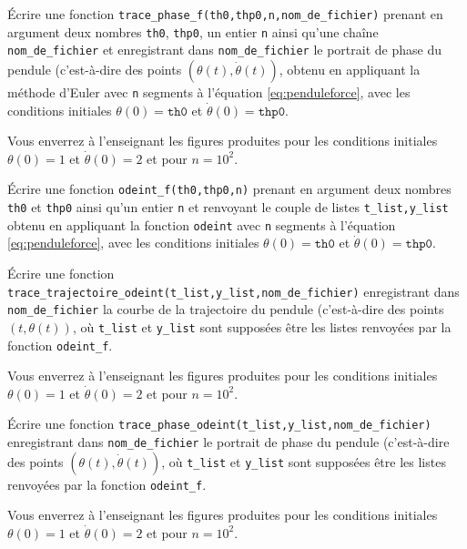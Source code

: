 \question{} \label{qu:trace_phase_f} Écrire une fonction \texttt{trace\_phase\_f(th0,thp0,n,nom\_de\_fichier)} prenant en argument deux nombres \texttt{th0}, \texttt{thp0}, un entier \texttt{n} ainsi qu'une chaîne \texttt{nom\_de\_fichier} et enregistrant dans \texttt{nom\_de\_fichier} le portrait de phase du pendule (c'est-à-dire des points $(\theta(t),\dot{\theta}(t))$, obtenu en appliquant la méthode d'Euler avec \texttt{n} segments à l'équation \eqref{eq:penduleforce}, avec les conditions initiales  $ \theta(0) = \texttt{th0}$ et $\dot{\theta}(0) = \texttt{thp0}$.

Vous enverrez à l'enseignant les figures produites pour les conditions initiales $\theta(0) = 1$ et $\dot{\theta}(0) = 2$ et pour $n=10^2$. 


\medskip

\question{\label{qu:odeintf}} \'Ecrire une fonction \texttt{odeint\_f(th0,thp0,n)} prenant en argument deux nombres \texttt{th0} et \texttt{thp0} ainsi qu'un entier \texttt{n} et renvoyant le couple de listes  \texttt{t\_list,y\_list} obtenu en appliquant la fonction \texttt{odeint} avec \texttt{n} segments à l'équation \eqref{eq:penduleforce}, avec les conditions initiales  $ \theta(0) = \texttt{th0}$ et $\dot{\theta}(0) = \texttt{thp0}$.

\medskip{}

\question{}\label{qu:trace_trajectoire_odeint} Écrire une fonction \texttt{trace\_trajectoire\_odeint(t\_list,y\_list,nom\_de\_fichier)} enregistrant dans \texttt{nom\_de\_fichier} la courbe de la trajectoire du pendule (c'est-à-dire des points $(t,\theta(t))$, où \texttt{t\_list} et \texttt{y\_list} sont supposées être les listes renvoyées par la fonction \texttt{odeint\_f}.

Vous enverrez à l'enseignant les figures produites pour les conditions initiales $\theta(0) = 1$ et $\dot{\theta}(0) = 2$ et pour $n=10^2$. 

\medskip{}

\question{}\label{qu:trace_phase_odeint} Écrire une fonction \texttt{trace\_phase\_odeint(t\_list,y\_list,nom\_de\_fichier)} enregistrant dans \texttt{nom\_de\_fichier} le portrait de phase du pendule (c'est-à-dire des points $(\theta(t),\dot{\theta}(t))$, où \texttt{t\_list} et \texttt{y\_list} sont supposées être les listes renvoyées par la fonction \texttt{odeint\_f}.

Vous enverrez à l'enseignant les figures produites pour les conditions initiales $\theta(0) = 1$ et $\dot{\theta}(0) = 2$ et pour $n=10^2$. 
